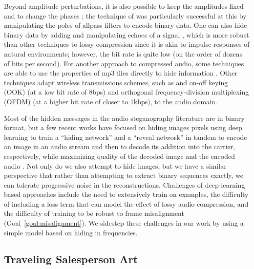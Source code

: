 \documentclass[runningheads]{llncs}
\begin{document}
Beyond amplitude perturbations, it is also possible to keep the amplitudes fixed and to change the phases \cite{xiaoxiao_dong_data_2004, yun2009acoustic}; the technique of \cite{malik_robust_2007} was particularly successful at this by manipulating the poles of allpass filters to encode binary data.  One can also hide binary data by adding and manipulating echoes of a signal \cite{gruhl1996echo}, which is more robust than other techniques to lossy compression since it is akin to impulse responses of natural environments; however, the bit rate is quite low (on the order of dozens of bits per second).  For another approach to compressed audio, some techniques are able to use the properties of mp3 files directly to hide information \cite{qiao_steganalysis_2009,atoum2013exploring}.  Other techniques adapt wireless transmissions schemes, such as and on-off keying (OOK) \cite{madhavapeddy_audio_2005} (at a low bit rate of 8bps) and orthogonal frequency-division multiplexing (OFDM) \cite{eichelberger_receiving_2019} (at a higher bit rate of closer to 1kbps), to the audio domain.

Most of the hidden messages in the audio steganography literature are in binary format, but a few recent works have focused on hiding images pixels using deep learning to train a ``hiding network'' and a ``reveal network'' in tandem to encode an image in an audio stream and then to decode its addition into the carrier, respectively, while maximizing quality of the decoded image and the encoded audio \cite{cui_multi-stage_2021, geleta_pixinwav_2021, takahashi_source_2022, domenech2022hiding}.  Not only do we also attempt to hide images, but we have a similar perspective that rather than attempting to extract binary sequences exactly, we can tolerate progressive noise in the reconstructions.  Challenges of deep-learning based approaches include the need to extensively train on examples, the difficulty of including a loss term that can model the effect of lossy audio compression, and the difficulty of training to be robust to frame misalignment (Goal~\ref{goal:misalignment}).  We sidestep these challenges in our work by using a simple model based on hiding in frequencies.

\subsection{Traveling Salesperson Art}
\label{sec:tspart}
\end{document}
